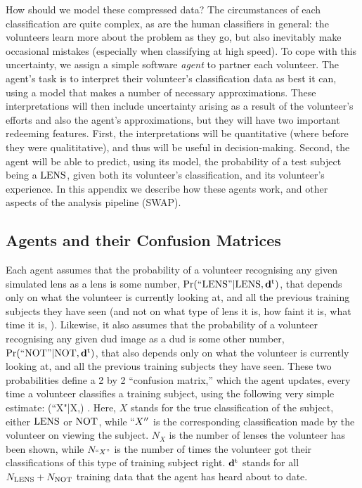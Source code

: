 \documentclass[useAMS,usenatbib,a4paper]{mn2e}
\begin{document}
How should we model these compressed data? The circumstances of each
classification are quite complex, as are the human classifiers in general: the
volunteers learn more about the problem as they go, but also inevitably make
occasional mistakes (especially when classifying at high speed).
To cope with this uncertainty, we assign a
simple software {\it agent} to partner each volunteer. The agent's task is to
interpret their volunteer's classification data as best it can, using a model
that makes a number of necessary approximations. These interpretations will
then include uncertainty arising as a result of the volunteer's efforts and
also the agent's approximations, but they will have two important redeeming
features. First, the interpretations will be quantitative (where before they
were qualititative),  and thus will be useful in decision-making. Second, the
agent will be able to predict, using its model, the probability of a test
subject being a ${\rm LENS}$, given both its volunteer's classification, and its
volunteer's experience. In this appendix we describe how these agents work,
and other aspects of the \SW analysis pipeline (SWAP).


\subsection{Agents and their Confusion Matrices}
\label{appendix:swap:probabilities}

Each agent assumes that the probability of a volunteer recognising any given
simulated lens as a lens is some number, ${\rm Pr}({\rm ``LENS"}|{\rm LENS},{\mathbf{d}^{\rm t}})$, that
depends only on what the volunteer is currently looking at, and all the
previous training subjects they have seen (and not on what type of lens it is,
how faint it is, what time it is, \etc). Likewise, it also assumes that the
probability of a volunteer recognising any given dud image as a dud is some
other number, ${\rm Pr}({\rm ``NOT"}|{\rm NOT},{\mathbf{d}^{\rm t}})$, that also depends only on what the volunteer is currently looking at, and all the
previous training subjects they have seen. These two probabilities define a
2 by 2 ``confusion matrix,'' which the agent updates, every time a
volunteer classifies a training subject, using the following
very simple estimate:
\be
  \pr(``X"|X,\training) \approx {}.
  \label{eq:app:fraction}
\ee
Here, $X$ stands for the true classification of the subject, \ie either
${\rm LENS}$ or ${\rm NOT}$, while $``X''$ is the corresponding classification
made by the volunteer on viewing the subject. $N_X$ is the number of
lenses the volunteer has been shown, while $N_{``X"}$ is the number of
times the volunteer got their classifications of this type of training subject
right. ${\mathbf{d}^{\rm t}}$ stands for all
$N_{{\rm LENS}} + N_{{\rm NOT}}$ training data that the agent has heard about to
date.
\end{document}
